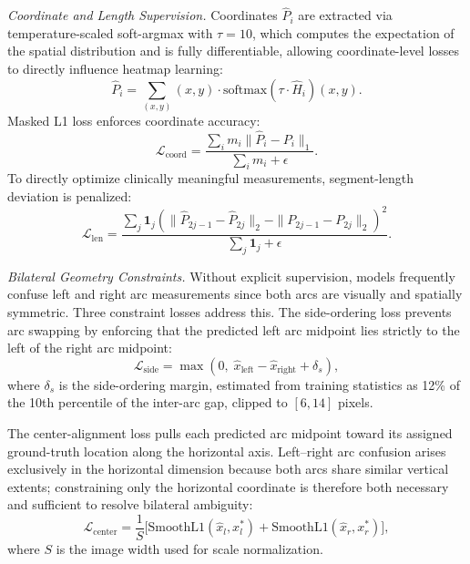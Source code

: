 \documentclass[conference]{IEEEtran}
\begin{document}
\textit{Coordinate and Length Supervision.}
Coordinates $\hat{P}_i$ are extracted via temperature-scaled soft-argmax
\cite{sun2018integral} with $\tau=10$, which computes the expectation of the spatial
distribution and is fully differentiable, allowing coordinate-level losses to directly
influence heatmap learning:
\begin{equation}
\hat{P}_i = \sum_{(x,y)} (x,y) \cdot \mathrm{softmax}(\tau \cdot \hat{H}_i)(x,y).
\label{eq:softargmax}
\end{equation}
Masked L1 loss enforces coordinate accuracy:
\begin{equation}
\mathcal{L}_{\text{coord}}
= \frac{\sum_i m_i \|\hat{P}_i - P_i\|_1}{\sum_i m_i + \epsilon}.
\label{eq:coord}
\end{equation}
To directly optimize clinically meaningful measurements, segment-length deviation is penalized:
\begin{equation}
\mathcal{L}_{\text{len}}
= \frac{\sum_j \mathbf{1}_j
  \!\left(\|\hat{P}_{2j-1}{-}\hat{P}_{2j}\|_2 - \|P_{2j-1}{-}P_{2j}\|_2\right)^2}
{\sum_j \mathbf{1}_j + \epsilon}.
\label{eq:length}
\end{equation}

\textit{Bilateral Geometry Constraints.}
Without explicit supervision, models frequently confuse left and right arc measurements since
both arcs are visually and spatially symmetric. Three constraint losses address this. The
side-ordering loss prevents arc swapping by enforcing that the predicted left arc midpoint lies
strictly to the left of the right arc midpoint:
\begin{equation}
\mathcal{L}_{\text{side}}
= \max(0,\; \hat{x}_{\text{left}} - \hat{x}_{\text{right}} + \delta_s),
\label{eq:side}
\end{equation}
where $\delta_s$ is the side-ordering margin, estimated from training statistics as 12\% of the
10th percentile of the inter-arc gap, clipped to $[6,14]$ pixels.

The center-alignment loss pulls each predicted arc midpoint toward its assigned ground-truth
location along the horizontal axis. Left--right arc confusion arises exclusively in the
horizontal dimension because both arcs share similar vertical extents; constraining only the
horizontal coordinate is therefore both necessary and sufficient to resolve bilateral ambiguity:
\begin{equation}
\mathcal{L}_{\text{center}}
= \frac{1}{S}\bigl[
  \mathrm{SmoothL1}(\hat{x}_l, x_l^*) + \mathrm{SmoothL1}(\hat{x}_r, x_r^*)
\bigr],
\label{eq:center}
\end{equation}
where $S$ is the image width used for scale normalization.
\end{document}
